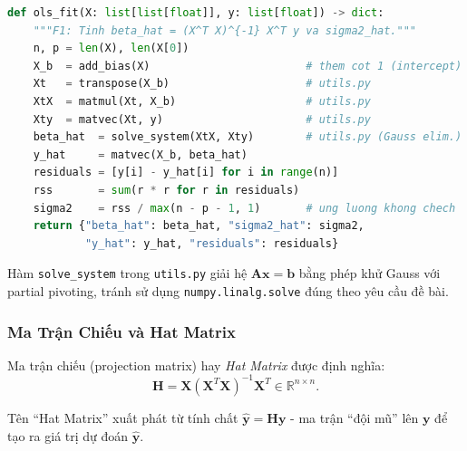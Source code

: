 \begin{lstlisting}[language=Python, caption={Hàm \texttt{ols\_fit} - tính nghiệm OLS từ công thức Normal Equations}]
def ols_fit(X: list[list[float]], y: list[float]) -> dict:
    """F1: Tinh beta_hat = (X^T X)^{-1} X^T y va sigma2_hat."""
    n, p = len(X), len(X[0])
    X_b  = add_bias(X)                        # them cot 1 (intercept)
    Xt   = transpose(X_b)                     # utils.py
    XtX  = matmul(Xt, X_b)                    # utils.py
    Xty  = matvec(Xt, y)                      # utils.py
    beta_hat  = solve_system(XtX, Xty)        # utils.py (Gauss elim.)
    y_hat     = matvec(X_b, beta_hat)
    residuals = [y[i] - y_hat[i] for i in range(n)]
    rss       = sum(r * r for r in residuals)
    sigma2    = rss / max(n - p - 1, 1)       # ung luong khong chech
    return {"beta_hat": beta_hat, "sigma2_hat": sigma2,
            "y_hat": y_hat, "residuals": residuals}
\end{lstlisting}

Hàm \texttt{solve\_system} trong \texttt{utils.py} giải hệ $\mathbf{A}\mathbf{x}
= \mathbf{b}$ bằng phép khử Gauss với partial pivoting, tránh sử dụng
\texttt{numpy.linalg.solve} đúng theo yêu cầu đề bài.

\subsubsection{Ma Trận Chiếu và Hat Matrix}

\begin{tcolorbox}[mycodebox, colback=blue!3!white, colframe=blue!40!black,
    title={\textbf{Định nghĩa 1.2} - Hat Matrix}]
Ma trận chiếu (projection matrix) hay \emph{Hat Matrix} được định nghĩa:
\begin{equation}
    \mathbf{H} = \mathbf{X}(\mathbf{X}^T\mathbf{X})^{-1}\mathbf{X}^T
    \in \mathbb{R}^{n \times n}.
    \label{eq:hat_matrix}
\end{equation}
\end{tcolorbox}

Tên ``Hat Matrix'' xuất phát từ tính chất $\hat{\mathbf{y}} = \mathbf{H}\mathbf{y}$
- ma trận ``đội mũ'' lên $\mathbf{y}$ để tạo ra giá trị dự đoán $\hat{\mathbf{y}}$.

